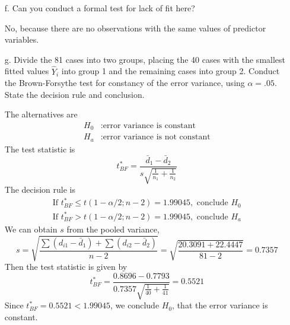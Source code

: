 \documentclass[10pt]{report}
\begin{document}
\begin{enumerate}
	\item [f.]
	Can you conduct a formal test for lack of fit here?
	
	No, because there are no observations with the same values of predictor variables.
	
	\item [g.]
	Divide the 81 cases into two groups, placing the 40 cases with the smallest fitted values $\hat{Y}_i$ into group 1 and the remaining cases into group 2. Conduct the Brown-Forsythe test for constancy of the error variance, using $\alpha = .05$. State the decision rule and conclusion.
	
	The alternatives are
	\begin{align*}
		H_0 &: \text{error variance is constant}\\
		H_a &: \text{error variance is not constant}
	\end{align*}
	The test statistic is
	\[
	t_{BF}^* = \frac{\bar{d}_1 - \bar{d}_2}{s\sqrt{\frac{1}{n_1} + \frac{1}{n_2}}}
	\]
	The decision rule is
	\begin{align*}
		\text{If } t_{BF}^* \le t(1-\alpha/2; n-2) = 1.99045, \text{ conclude } H_0\\
		\text{If } t_{BF}^* > t(1-\alpha/2; n-2) = 1.99045, \text{ conclude } H_a
	\end{align*}
	We can obtain $s$ from the pooled variance,
	\[
	s = \sqrt{\frac{\sum (d_{i1} - \bar{d}_1) + \sum (d_{i2} - \bar{d}_2)}{n-2}} = \sqrt{\frac{20.3091 + 22.4447}{81-2}} = 0.7357
	\]
	Then the test statistic is given by
	\[
	t_{BF}^* = \frac{0.8696 - 0.7793}{0.7357\sqrt{\frac{1}{40} + \frac{1}{41}}} = 0.5521
	\]
	Since $t_{BF}^* = 0.5521 < 1.99045$, we conclude $H_0$, that the error variance is constant.
	
\end{enumerate}
\end{document}
